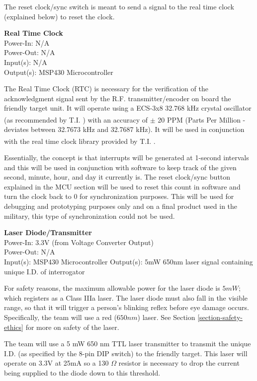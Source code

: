 \documentclass[letterpaper,10pt]{article}
\begin{document}
\begin{spacing}{1.15}
The reset clock/sync switch is meant to send a signal to the real time clock (explained below) to reset the clock.

\normalsize\textbf{Real Time Clock}\\
Power-In: N/A \\
Power-Out: N/A \\
Input(s): N/A \\
Output(s): MSP430 Microcontroller

The Real Time Clock (RTC) is necessary for the verification of the acknowledgment signal sent by the R.F. transmitter/encoder on board the friendly target unit. It will operate using a ECS-3x8 32.768 kHz crystal oscillator (as recommended by T.I. \textsuperscript{\cite{RTC-Implementation}}) with an accuracy of $\pm$ 20 PPM \textsuperscript{\cite{Crystal}} (Parts Per Million - deviates between 32.7673 kHz and 32.7687 kHz). It will be used in conjunction with the real time clock library provided by T.I. \textsuperscript{\cite{RTC-Library}}.

Essentially, the concept is that interrupts will be generated at 1-second intervals and this will be used in conjunction with software to keep track of the given second, minute, hour, and day it currently is. The reset clock/sync button explained in the MCU section will be used to reset this count in software and turn the clock back to 0 for synchronization purposes. This will be used for debugging and prototyping purposes only and on a final product used in the military, this type of synchronization could not be used.

\normalsize\textbf{Laser Diode/Transmitter}\\
Power-In: 3.3V (from Voltage Converter Output) \\
Power-Out: N/A \\
Input(s): MSP430 Microcontroller
Output(s):  5mW 650nm laser signal containing unique I.D. of interrogator 

For safety reasons, the maximum allowable power for the laser diode is $5mW$; which registers as a Class IIIa laser. The laser diode must also fall in the visible range, so that it will trigger a person's blinking reflex before eye damage occurs. Specifically, the team will use a red ($650nm$) laser. See Section \ref{section-safety-ethics} for more on safety of the laser. 

The team will use a 5 mW 650 nm TTL laser transmitter to transmit the unique I.D. (as specified by the 8-pin DIP switch) to the friendly target. This laser will operate on 3.3V at 25mA so a 130 $\Omega$  resistor is necessary to drop the current being supplied to the diode down to this threshold. 


\end{spacing}
\end{document}

